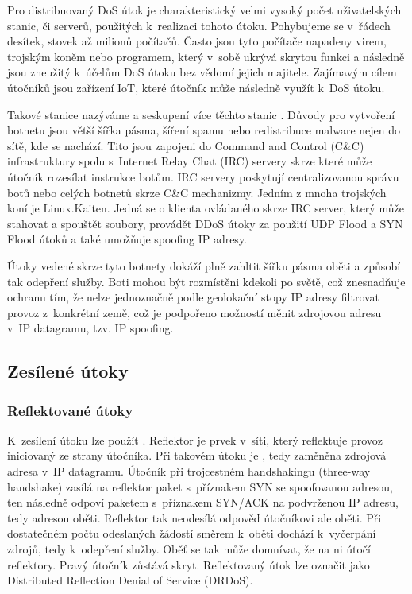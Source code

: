Pro distribuovaný DoS útok je charakteristický velmi vysoký počet uživatelských stanic,
či serverů, použitých k~realizaci tohoto útoku. Pohybujeme se v~řádech desítek, stovek až
milionů počítačů. 
Často jsou tyto počítače napadeny virem, trojským koněm nebo programem, který v~sobě ukrývá
skrytou funkci a následně jsou zneužitý k~účelům DoS útoku bez vědomí jejich majitele.
Zajímavým cílem útočníků jsou zařízení IoT, které útočník může následně využít k~DoS
útoku.

Takové stanice nazýváme  a seskupení více těchto stanic . Důvody pro
vytvoření botnetu jsou větší šířka pásma, šíření spamu nebo redistribuce malware nejen do sítě,
kde se  nachází. Tito  jsou zapojeni do Command and Control (C\&C) infrastruktury spolu
s~Internet Relay Chat (IRC) servery skrze které může útočník rozesílat instrukce botům. %
IRC servery poskytují centralizovanou správu botů nebo celých botnetů skrze C\&C
mechanizmy. Jedním z mnoha trojských koní je Linux.Kaiten. Jedná se o klienta ovládaného skrze
IRC server, který může stahovat a spouštět soubory, provádět DDoS útoky za
použití UDP Flood a SYN Flood útoků a také umožňuje spoofing IP adresy.

Útoky vedené skrze tyto botnety dokáží plně zahltit šířku pásma oběti a způsobí tak odepření
služby. 
Boti mohou být rozmístěni kdekoli po světě, což znesnadňuje ochranu tím, že nelze
jednoznačně podle geolokační stopy IP adresy filtrovat provoz z~konkrétní země, což je
podpořeno možností měnit zdrojovou adresu v~IP datagramu, tzv. IP spoofing.

\subsection{Zesílené útoky}
\label{subsec:zesilene_utoky}
\subsubsection{Reflektované útoky}
\label{subsec:reflektovane_utoky}
K~zesílení útoku lze použít . Reflektor je prvek v~síti, který reflektuje provoz
iniciovaný ze strany útočníka. Při takovém útoku je , tedy zaměněna zdrojová adresa
v~IP datagramu. Útočník při trojcestném handshakingu (three-way handshake) zasílá na reflektor
paket s~příznakem SYN se spoofovanou adresou, ten následně odpoví paketem s~příznakem SYN/ACK
na podvrženou IP adresu, tedy adresou oběti. Reflektor tak neodesílá odpověď útočníkovi ale
oběti. Při dostatečném počtu odeslaných žádostí směrem k~oběti dochází k~vyčerpání zdrojů, tedy
k~odepření služby. Oběť se tak může domnívat, že na ni útočí reflektory. Pravý útočník zůstává
skryt. Reflektovaný útok lze označit jako Distributed Reflection Denial of Service (DRDoS).

